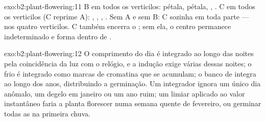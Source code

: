 \begin{solution}{exo:b2:plant-flowering:11}
B em todos os verticilos: pétala, pétala, , . C em todos os
verticilos (C reprime A): , , , . Sem A e sem
B: C sozinha em toda parte ---  nos quatro verticilos. C também
encerra o ; sem ela, o centro permanece indeterminado e forma
 dentro de .
\end{solution}

\begin{solution}{exo:b2:plant-flowering:12}
O comprimento do dia é integrado ao longo das noites pela coincidência
da luz com o relógio, e a indução exige várias dessas noites; o frio é
integrado como marcas de cromatina que se acumulam; o banco de 
integra ao longo dos anos, distribuindo a germinação. Um integrador
ignora um único dia anômalo, um degelo em janeiro ou um ano ruim; um
limiar aplicado ao valor instantâneo faria a planta florescer numa
semana quente de fevereiro, ou germinar todas as  na primeira
chuva.
\end{solution}

